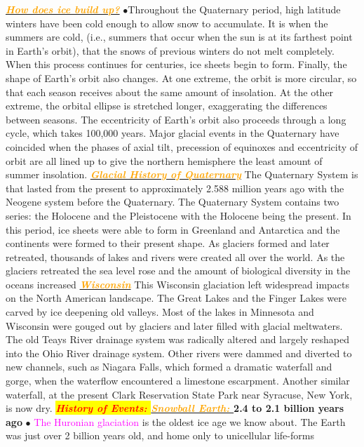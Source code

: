 \documentclass{article}
\newcommand{\ddd}{$\bullet$}
\newcommand{\red}[1]{\textcolor{red}{#1}}
\newcommand{\pink}[1]{\textcolor{magenta}{#1}}
\newcommand{\orange}[1]{\textcolor{orange}{#1}}
\newcommand{\mysection}[1]{\colorbox{yellow}{{\textbf{\textbf{\textit{\red{#1}}}}}}}
\newcommand{\mysub}[1]{\underline{\textbf{{\textit{\orange{#1}}}}}}
\newcommand{\vocab}[1]{{\pink{#1}}}
\begin{document}
\begin{multicols*}{4}
            \mysub{How does ice build up?}
                \ddd Throughout the Quaternary period, high latitude winters have been cold enough to allow snow to accumulate. It is when the summers are cold, (i.e., summers that occur when the sun is at its farthest point in Earth's orbit), that the snows of previous winters do not melt completely. When this process continues for centuries, ice sheets begin to form. Finally, the shape of Earth's orbit also changes. At one extreme, the orbit is more circular, so that each season receives about the same amount of insolation. At the other extreme, the orbital ellipse is stretched longer, exaggerating the differences between seasons. The eccentricity of Earth's orbit also proceeds through a long cycle, which takes 100,000 years. Major glacial events in the Quaternary have coincided when the phases of axial tilt, precession of equinoxes and eccentricity of orbit are all lined up to give the northern hemisphere the least amount of summer insolation.
            \mysub{Glacial History of Quaternary}
                The Quaternary System is that lasted from the present to approximately 2.588 million years ago with the Neogene system before the Quaternary. The Quaternary System contains two series: the Holocene and the Pleistocene with the Holocene being the present. In this period, ice sheets were able to form in Greenland and Antarctica and the continents were formed to their present shape. As glaciers formed and later retreated, thousands of lakes and rivers were created all over the world. As the glaciers retreated the sea level rose and the amount of biological diversity in the oceans increased
             \mysub{Wisconsin}
             	This Wisconsin glaciation left widespread impacts on the North American landscape. The Great Lakes and the Finger Lakes were carved by ice deepening old valleys. Most of the lakes in Minnesota and Wisconsin were gouged out by glaciers and later filled with glacial meltwaters. The old Teays River drainage system was radically altered and largely reshaped into the Ohio River drainage system. Other rivers were dammed and diverted to new channels, such as Niagara Falls, which formed a dramatic waterfall and gorge, when the waterflow encountered a limestone escarpment. Another similar waterfall, at the present Clark Reservation State Park near Syracuse, New York, is now dry.
     \mysection{History of Events: }
     		\mysub{Snowball Earth: }
     			\textbf{2.4 to 2.1 billion years ago} \ddd
     			\vocab{The Huronian glaciation} is the oldest ice age we know about. The Earth was just over 2 billion years old, and home only to unicellular life-forms

\end{multicols*}
\end{document}
